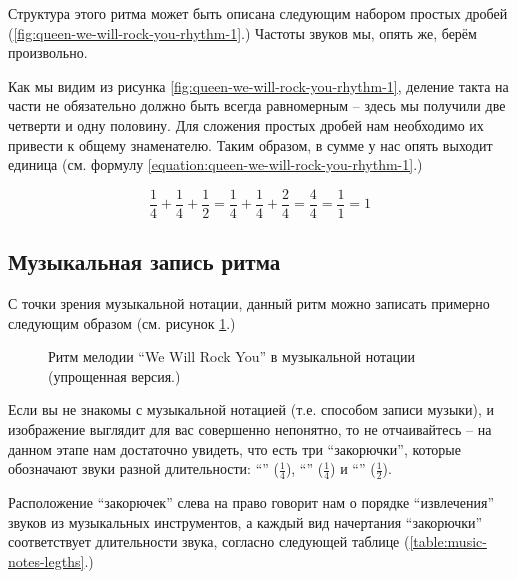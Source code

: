 \documentclass[../sparc.tex]{subfiles}
\begin{document}
Структура этого ритма может быть описана следующим набором простых дробей
(\ref{fig:queen-we-will-rock-you-rhythm-1}.) Частоты звуков мы, опять же, берём
произвольно.

Как мы видим из рисунка \ref{fig:queen-we-will-rock-you-rhythm-1}, деление такта
на части не обязательно должно быть всегда равномерным -- здесь мы получили две
четверти и одну половину.  Для сложения простых дробей нам необходимо их
привести к общему знаменателю.  Таким образом, в сумме у нас опять выходит
единица (см. формулу \ref{equation:queen-we-will-rock-you-rhythm-1}.)

\begin{equation}
  \frac{1}{4} + \frac{1}{4} + \frac{1}{2} = \frac{1}{4} + \frac{1}{4} + \frac{2}{4} = \frac{4}{4} = \frac{1}{1} = 1
  \label{equation:queen-we-will-rock-you-rhythm-1}
\end{equation}

\subsection{Музыкальная запись ритма}

С точки зрения музыкальной нотации, данный ритм можно записать примерно
следующим образом (см. рисунок \ref{fig:lilypond-queen-1}.)

\begin{figure}[ht]
  \centering
  \caption{Ритм мелодии ``We Will Rock You'' в музыкальной нотации (упрощенная версия.)}
  \label{fig:lilypond-queen-1}
\end{figure}

Если вы не знакомы с музыкальной нотацией (т.е. способом записи музыки), и
изображение выглядит для вас совершенно непонятно, то не отчаивайтесь -- на
данном этапе нам достаточно увидеть, что есть три ``закорючки'', которые
обозначают звуки разной длительности: ``\quarterNote'' ($\frac{1}{4}$),
``\quarterNote'' ($\frac{1}{4}$) и ``\halfNote'' ($\frac{1}{2}$).

Расположение ``закорючек'' слева на право говорит нам о порядке ``извлечения''
звуков из музыкальных инструментов, а каждый вид начертания ``закорючки''
соответствует длительности звука, согласно следующей таблице
(\ref{table:music-notes-legths}.)
\end{document}
